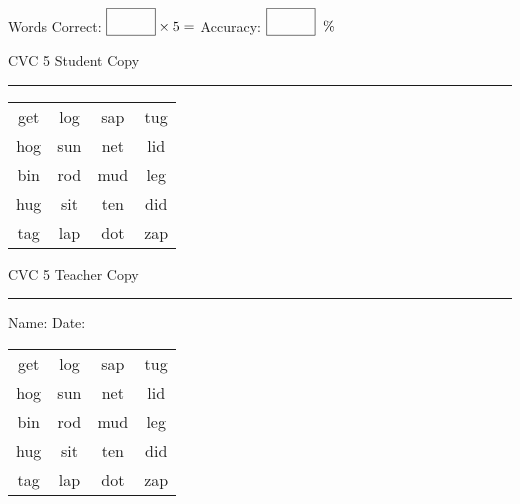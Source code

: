 \documentclass{memoir}
\begin{document}
\small

Words Correct: $\fbox{\phantom{\huge 100}} \times 5 = $ Accuracy: $\fbox{\phantom{\huge 100}}\;\; \%$ 

\vfill

\newpage


\footnotesize \noindent
CVC 5 \hfill Student Copy
\smallskip
\hrule

\Large

\setlength{\tabcolsep}{14pt}
\def\arraystretch{2}

{\selectfont


\begin{vplace}[0.5]
\begin{center}
\begin{tabular}{cccc}
get & log & sap & tug \\
hog & sun & net & lid \\
bin & rod & mud & leg \\
hug & sit & ten & did \\
tag & lap & dot & zap \\
\end{tabular}
\end{center}
\end{vplace}

}

\newpage

\footnotesize \noindent
CVC 5 \hfill Teacher Copy
\smallskip
\hrule

\small

\vfill

\noindent
Name: \underline{\hspace{1.75in}} \hfill Date: \underline{\hspace{1in}}

\Large

{\selectfont


\begin{vplace}[0.5]
\begin{center}
\begin{tabular}{cccc}
get & log & sap & tug \\
hog & sun & net & lid \\
bin & rod & mud & leg \\
hug & sit & ten & did \\
tag & lap & dot & zap \\
\end{tabular}
\end{center}
\end{vplace}



}
\end{document}
